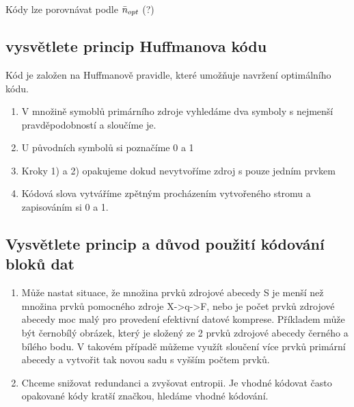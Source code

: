 Kódy lze porovnávat podle $\Bar{n}_{opt}$ (?)

\subsection{vysvětlete princip Huffmanova kódu}
Kód je založen na Huffmanově pravidle, které umožňuje navržení optimálního kódu.

\begin{enumerate}
    \item V množině symoblů primárního zdroje vyhledáme dva symboly s nejmenší pravděpodobností a sloučíme je.
    \item U původních symbolů si poznačíme 0 a 1
    \item Kroky 1) a 2) opakujeme dokud nevytvoříme zdroj s pouze jedním prvkem
    \item Kódová slova vytváříme zpětným procházením vytvořeného stromu a zapisováním si 0 a 1.
\end{enumerate}

\subsection{Vysvětlete princip a důvod použití kódování bloků dat}
\begin{enumerate}
    \item Může nastat situace, že množina prvků zdrojové abecedy S je menší než množina prvků pomocného zdroje 
    X->q->F, nebo je počet prvků zdrojové abecedy moc malý pro provedení efektivní datové komprese. 
    Příkladem může být černobílý obrázek, který je složený ze 2 prvků zdrojové abecedy černého a bílého bodu.
    V takovém případě můžeme využít sloučení více prvků primární abecedy a vytvořit tak novou sadu s vyšším počtem prvků.
    \item Chceme snižovat redundanci a zvyšovat entropii. Je vhodné kódovat často opakované kódy kratší značkou, 
    hledáme vhodné kódování.
\end{enumerate}

